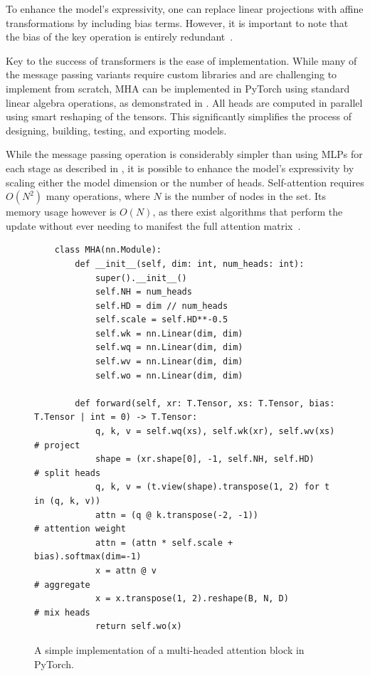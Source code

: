 To enhance the model's expressivity, one can replace linear projections with affine transformations by including bias terms. However, it is important to note that the bias of the key operation is entirely redundant~\cite{RoleBiasTerms}.

Key to the success of transformers is the ease of implementation.
While many of the message passing variants require custom libraries and are challenging to implement from scratch, \Gls{MHA} can be implemented in PyTorch using standard linear algebra operations, as demonstrated in .
All heads are computed in parallel using smart reshaping of the tensors.
This significantly simplifies the process of designing, building, testing, and exporting models.

While the message passing operation is considerably simpler than using \Glspl{MLP} for each stage as described in , it is possible to enhance the model's expressivity by scaling either the model dimension or the number of heads.
Self-attention requires $O(N^2)$ many operations, where $N$ is the number of nodes in the set.
Its memory usage however is $O(N)$, as there exist algorithms that perform the update without ever needing to manifest the full attention matrix~\cite{SelfattentionDoesNot, FlashAttentionFastMemoryEfficient}.

\begin{figure}
    \centering
    \scriptsize
    \begin{verbatim}
    class MHA(nn.Module):
        def __init__(self, dim: int, num_heads: int):
            super().__init__()
            self.NH = num_heads
            self.HD = dim // num_heads
            self.scale = self.HD**-0.5
            self.wk = nn.Linear(dim, dim)
            self.wq = nn.Linear(dim, dim)
            self.wv = nn.Linear(dim, dim)
            self.wo = nn.Linear(dim, dim)

        def forward(self, xr: T.Tensor, xs: T.Tensor, bias: T.Tensor | int = 0) -> T.Tensor:
            q, k, v = self.wq(xs), self.wk(xr), self.wv(xs)              # project
            shape = (xr.shape[0], -1, self.NH, self.HD)                  # split heads
            q, k, v = (t.view(shape).transpose(1, 2) for t in (q, k, v))
            attn = (q @ k.transpose(-2, -1))                             # attention weight
            attn = (attn * self.scale + bias).softmax(dim=-1)
            x = attn @ v                                                 # aggregate
            x = x.transpose(1, 2).reshape(B, N, D)                       # mix heads
            return self.wo(x)
    \end{verbatim}
    \caption{A simple implementation of a multi-headed attention block in PyTorch.}
    \label{code:attention}
\end{figure}

